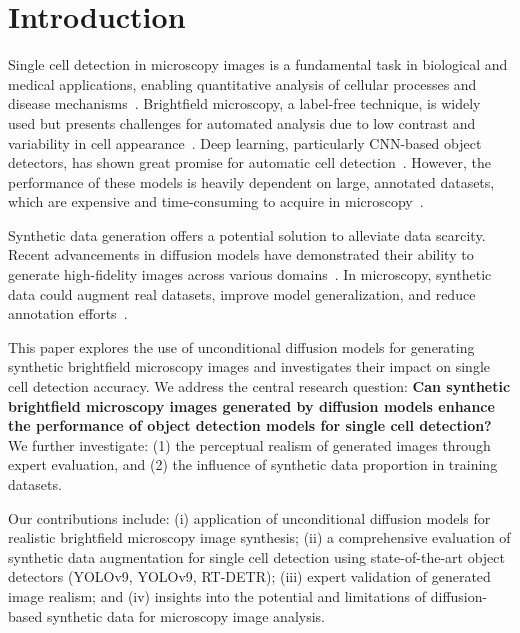 \section{Introduction}
\label{sec:introduction}
Single cell detection in microscopy images is a fundamental task in biological and medical applications, enabling quantitative analysis of cellular processes and disease mechanisms~\cite{meijering_cell_2012}.
Brightfield microscopy, a label-free technique, is widely used but presents challenges for automated analysis due to low contrast and variability in cell appearance~\cite{jyrki_selinummi_bright_2009}.
Deep learning, particularly CNN-based object detectors, has shown great promise for automatic cell detection~\cite{erick_moen_deep_2019,thorsten_falk_u-net_2019}.
However, the performance of these models is heavily dependent on large, annotated datasets, which are expensive and time-consuming to acquire in microscopy~\cite{ronneberger_u-net_2015}.

Synthetic data generation offers a potential solution to alleviate data scarcity.
Recent advancements in diffusion models have demonstrated their ability to generate high-fidelity images across various domains~\cite{ho_denoising_2020,song_denoising_2020}.
In microscopy, synthetic data could augment real datasets, improve model generalization, and reduce annotation efforts~\cite{rajaram_simucell_2012,trampert_deep_2021,lehmussola_synthetic_2008}.

This paper explores the use of unconditional diffusion models for generating synthetic brightfield microscopy images and investigates their impact on single cell detection accuracy.
We address the central research question: \textbf{Can synthetic brightfield microscopy images generated by diffusion models enhance the performance of object detection models for single cell detection?}
We further investigate: (1) the perceptual realism of generated images through expert evaluation, and (2) the influence of synthetic data proportion in training datasets.

Our contributions include: (i) application of unconditional diffusion models for realistic brightfield microscopy image synthesis;
(ii) a comprehensive evaluation of synthetic data augmentation for single cell detection using state-of-the-art object detectors (YOLOv9, YOLOv9, RT-DETR);
(iii) expert validation of generated image realism;
and (iv) insights into the potential and limitations of diffusion-based synthetic data for microscopy image analysis.
